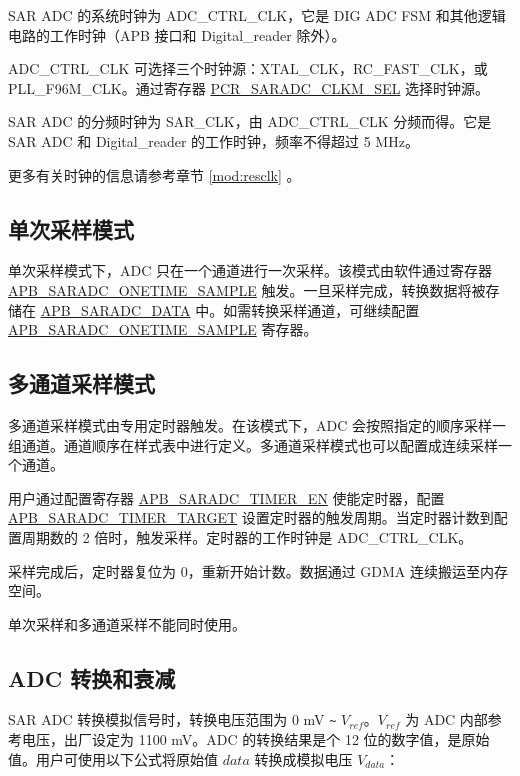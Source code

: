 \documentclass[main\_\_CN.tex]{subfiles}
\begin{document}
SAR ADC 的系统时钟为 ADC\_CTRL\_CLK，它是 DIG ADC FSM 和其他逻辑电路的工作时钟（APB 接口和 Digital\_reader 除外）。

ADC\_CTRL\_CLK 可选择三个时钟源：XTAL\_CLK，RC\_FAST\_CLK，或 PLL\_F96M\_CLK。通过寄存器 \hyperref[fielddesc:PCRSARADCCLKMSEL]{PCR\_SARADC\_CLKM\_SEL} 选择时钟源。

SAR ADC 的分频时钟为 SAR\_CLK，由 ADC\_CTRL\_CLK 分频而得。它是 SAR ADC 和 Digital\_reader 的工作时钟，频率不得超过 5 MHz。

更多有关时钟的信息请参考章节 \ref{mod:resclk} \textit{}。

\subsection{单次采样模式}

单次采样模式下，ADC 只在一个通道进行一次采样。该模式由软件通过寄存器 \hyperref[fielddesc:APBSARADCONETIMESAMPLE]{APB\_SARADC\_ONETIME\_SAMPLE} 触发。一旦采样完成，转换数据将被存储在 \hyperref[fielddesc:APBSARADCDATA]{APB\_SARADC\_DATA} 中。如需转换采样通道，可继续配置 \hyperref[fielddesc:APBSARADCONETIMESAMPLE]{APB\_SARADC\_ONETIME\_SAMPLE} 寄存器。
\subsection{多通道采样模式}

多通道采样模式由专用定时器触发。在该模式下，ADC 会按照指定的顺序采样一组通道。通道顺序在样式表中进行定义。多通道采样模式也可以配置成连续采样一个通道。

用户通过配置寄存器 \hyperref[fielddesc:APBSARADCTIMEREN]{APB\_SARADC\_TIMER\_EN} 使能定时器，配置 \hyperref[fielddesc:APBSARADCTIMERTARGET]{APB\_SARADC\_TIMER\_TARGET} 设置定时器的触发周期。当定时器计数到配置周期数的 2 倍时，触发采样。定时器的工作时钟是 ADC\_CTRL\_CLK。

采样完成后，定时器复位为 0，重新开始计数。数据通过 GDMA 连续搬运至内存空间。

\begin{tiplisting}
单次采样和多通道采样不能同时使用。
\end{tiplisting}

\subsection{ADC 转换和衰减}

SAR ADC 转换模拟信号时，转换电压范围为 0 mV \verb+~+ \(V_{ref}\)。\(V_{ref}\) 为 ADC 内部参考电压，出厂设定为 1100 mV。ADC 的转换结果是个 12 位的数字值，是原始值。用户可使用以下公式将原始值 \(data\) 转换成模拟电压 \(V_{data}\)：
\end{document}
